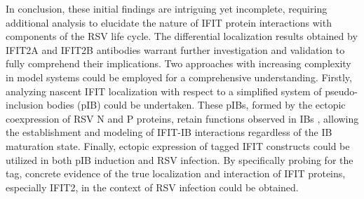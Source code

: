 In conclusion, these initial findings are intriguing yet incomplete, requiring additional analysis to elucidate the nature of IFIT protein interactions with components of the RSV life cycle. The differential localization results obtained by IFIT2A and IFIT2B antibodies warrant further investigation and validation to fully comprehend their implications. Two approaches with increasing complexity in model systems could be employed for a comprehensive understanding. Firstly, analyzing nascent IFIT localization with respect to a simplified system of pseudo-inclusion bodies (pIB) could be undertaken. These pIBs, formed by the ectopic coexpression of RSV N and P proteins, retain functions observed in IBs \cite{Rincheval2017FunctionalVirus, Galloux2020MinimalVitro, Jobe2020RespiratorySignaling}, allowing the establishment and modeling of IFIT-IB interactions regardless of the IB maturation state. Finally, ectopic expression of tagged IFIT constructs could be utilized in both pIB induction and RSV infection. By specifically probing for the tag, concrete evidence of the true localization and interaction of IFIT proteins, especially IFIT2, in the context of RSV infection could be obtained.

